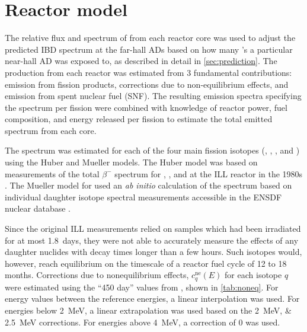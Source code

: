 \section{Reactor \texorpdfstring{\nuebar{}}{antineutrino} model}
\label{sec:reactor}

The relative flux and spectrum of \nuebar{} from each reactor core was used
to adjust the predicted IBD spectrum at the far-hall ADs
based on how many \nuebar{}'s a particular near-hall AD was exposed to,
as described in detail in \cref{sec:prediction}.
The \nuebar{} production from each reactor was estimated from 3 fundamental contributions:
emission from fission products, corrections due to non-equilibrium effects,
and emission from spent nuclear fuel (SNF).
The resulting emission spectra specifying the spectrum per fission
were combined with knowledge of reactor power, fuel composition,
and energy released per fission
to estimate the total emitted \nuebar{} spectrum from each core.

The \nuebar{} spectrum was estimated for each of the four main fission isotopes
(, , , and )
using the Huber \cite{reactor_huber} and Mueller \cite{reactor_mueller} models.
The Huber model was based on measurements of the total $\beta^{-}$ spectrum
for , , and 
at the ILL reactor in the 1980s
\cite{ill_1,ill_2,ill_3}.
The Mueller model for  used an \emph{ab initio} calculation
of the \nuebar{} spectrum
based on individual daughter isotope spectral measurements
accessible in the ENSDF nuclear database \cite{ensdf}.

Since the original ILL measurements relied on samples
which had been irradiated for at most 1.8~days,
they were not able to accurately measure
the effects of any daughter nuclides with decay times longer than a few hours.
Such isotopes would, however, reach equilibrium on the timescale
of a reactor fuel cycle of 12 to 18 months.
Corrections due to nonequilibrium effects, $c^{\text{ne}}_q(E)$
for each isotope $q$
were estimated using the ``450 day'' values from \cite{reactor_mueller},
shown in \cref{tab:noneq}.
For energy values between the reference energies,
a linear interpolation was used.
For energies below \SI{2}{\MeV}, a linear extrapolation was used
based on the \SIlist{2;2.5}{\MeV} corrections.
For energies above \SI{4}{\MeV}, a correction of 0 was used.

